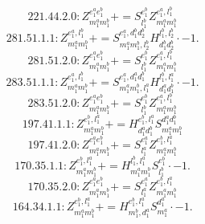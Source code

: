 \documentclass[letterpaper,10pt,fleqn,leqno,onecolumn]{article}
\begin{document}
\begin{equation} \;\;\;\;\;\;  221.44.2.0: Z^{e_{1}^{a}e_{1}^{b}}_{m_{1}^{a}m_{1}^{b}}+=S^{e_{1}^{b}}_{l_{1}^{b}}Z^{e_{1}^{a},l_{1}^{b}}_{m_{1}^{a}m_{1}^{b}} \end{equation}
\begin{equation} \;\;\;\;\;\;  281.51.1.1: Z^{e_{1}^{a},l_{1}^{b}}_{m_{1}^{a}m_{1}^{b}}+=S^{e_{1}^{a},d_{1}^{b}d_{2}^{b}}_{m_{1}^{a}m_{1}^{b},l_{2}^{b}}H^{l_{1}^{b},l_{2}^{b}}_{d_{1}^{b}d_{2}^{b}}\cdot -1. \end{equation}
\begin{equation} \;\;\;\;\;\;  281.51.2.0: Z^{e_{1}^{a}e_{1}^{b}}_{m_{1}^{a}m_{1}^{b}}+=S^{e_{1}^{b}}_{l_{1}^{b}}Z^{e_{1}^{a},l_{1}^{b}}_{m_{1}^{a}m_{1}^{b}} \end{equation}
\begin{equation} \;\;\;\;\;\;  283.51.1.1: Z^{e_{1}^{a},l_{1}^{b}}_{m_{1}^{a}m_{1}^{b}}+=S^{e_{1}^{a},d_{1}^{a}d_{1}^{b}}_{m_{1}^{a}m_{1}^{b},l_{1}^{a}}H^{l_{1}^{b},l_{1}^{a}}_{d_{1}^{a}d_{1}^{b}}\cdot -1. \end{equation}
\begin{equation} \;\;\;\;\;\;  283.51.2.0: Z^{e_{1}^{a}e_{1}^{b}}_{m_{1}^{a}m_{1}^{b}}+=S^{e_{1}^{b}}_{l_{1}^{b}}Z^{e_{1}^{a},l_{1}^{b}}_{m_{1}^{a}m_{1}^{b}} \end{equation}
\begin{equation} \;\;\;\;\;\;  197.41.1.1: Z^{e_{1}^{b},l_{1}^{a}}_{m_{1}^{a}m_{1}^{b}}+=H^{e_{1}^{b},l_{1}^{a}}_{d_{1}^{a}d_{1}^{b}}S^{d_{1}^{a}d_{1}^{b}}_{m_{1}^{a}m_{1}^{b}} \end{equation}
\begin{equation} \;\;\;\;\;\;  197.41.2.0: Z^{e_{1}^{a}e_{1}^{b}}_{m_{1}^{a}m_{1}^{b}}+=S^{e_{1}^{a}}_{l_{1}^{a}}Z^{e_{1}^{b},l_{1}^{a}}_{m_{1}^{a}m_{1}^{b}} \end{equation}
\begin{equation} \;\;\;\;\;\;  170.35.1.1: Z^{e_{1}^{b},l_{1}^{a}}_{m_{1}^{a}m_{1}^{b}}+=H^{l_{1}^{b},l_{1}^{a}}_{m_{1}^{a}m_{1}^{b}}S^{e_{1}^{b}}_{l_{1}^{b}}\cdot -1. \end{equation}
\begin{equation} \;\;\;\;\;\;  170.35.2.0: Z^{e_{1}^{a}e_{1}^{b}}_{m_{1}^{a}m_{1}^{b}}+=S^{e_{1}^{a}}_{l_{1}^{a}}Z^{e_{1}^{b},l_{1}^{a}}_{m_{1}^{a}m_{1}^{b}} \end{equation}
\begin{equation} \;\;\;\;\;\;  164.34.1.1: Z^{e_{1}^{b},l_{1}^{a}}_{m_{1}^{a}m_{1}^{b}}+=H^{e_{1}^{b},l_{1}^{a}}_{m_{1}^{b},d_{1}^{a}}S^{d_{1}^{a}}_{m_{1}^{a}}\cdot -1. \end{equation}
\end{document}
